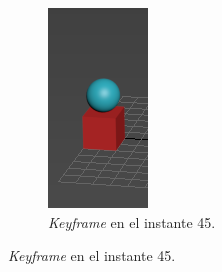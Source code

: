 \documentclass{article}
\begin{document}
\begin{figure}[H]
\begin{subfigure}[H]{0.15\textwidth}
	\end{subfigure}
    \hfill
	\begin{subfigure}[H]{0.15\textwidth}
	    \centering
	    \includegraphics[width=\textwidth]{imagenes/Ejercicio 1/p1_ins15_short.png}
	    \caption{\textit{Keyframe} en el instante 45.}

\end{subfigure}
\end{figure}
\end{document}
